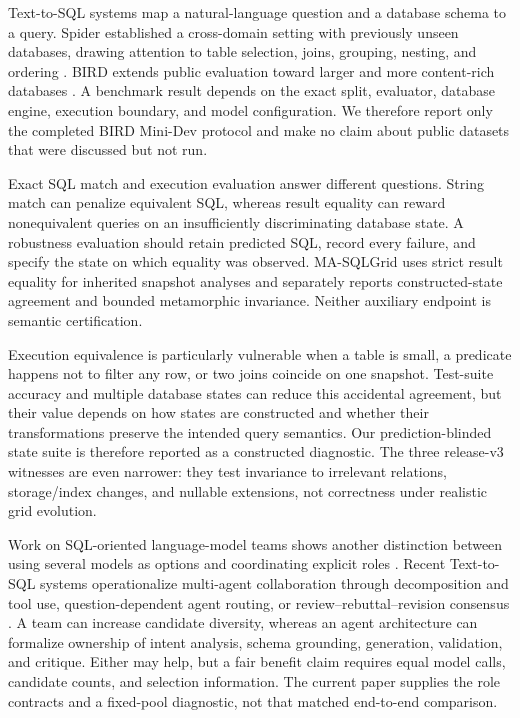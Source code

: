 \documentclass[applsci,article,submit,moreauthors]{Definitions/mdpi}
\newcommand{\masql}{MA-SQLGrid}
\begin{document}
Text-to-SQL systems map a natural-language question and a database schema to a query. Spider established a cross-domain setting with previously unseen databases, drawing attention to table selection, joins, grouping, nesting, and ordering \cite{yu2018spider}. BIRD extends public evaluation toward larger and more content-rich databases \cite{li2023bird}. A benchmark result depends on the exact split, evaluator, database engine, execution boundary, and model configuration. We therefore report only the completed BIRD Mini-Dev protocol and make no claim about public datasets that were discussed but not run.

Exact SQL match and execution evaluation answer different questions. String match can penalize equivalent SQL, whereas result equality can reward nonequivalent queries on an insufficiently discriminating database state. A robustness evaluation should retain predicted SQL, record every failure, and specify the state on which equality was observed. \masql{} uses strict result equality for inherited snapshot analyses and separately reports constructed-state agreement and bounded metamorphic invariance. Neither auxiliary endpoint is semantic certification.

Execution equivalence is particularly vulnerable when a table is small, a predicate happens not to filter any row, or two joins coincide on one snapshot. Test-suite accuracy and multiple database states can reduce this accidental agreement, but their value depends on how states are constructed and whether their transformations preserve the intended query semantics. Our prediction-blinded state suite is therefore reported as a constructed diagnostic. The three release-v3 witnesses are even narrower: they test invariance to irrelevant relations, storage/index changes, and nullable extensions, not correctness under realistic grid evolution.

Work on SQL-oriented language-model teams shows another distinction between using several models as options and coordinating explicit roles \cite{lee2025team}. Recent Text-to-SQL systems operationalize multi-agent collaboration through decomposition and tool use, question-dependent agent routing, or review--rebuttal--revision consensus \cite{wang2025macsql,shao2025qcmasql,xia2025r3}. A team can increase candidate diversity, whereas an agent architecture can formalize ownership of intent analysis, schema grounding, generation, validation, and critique. Either may help, but a fair benefit claim requires equal model calls, candidate counts, and selection information. The current paper supplies the role contracts and a fixed-pool diagnostic, not that matched end-to-end comparison.
\end{document}
